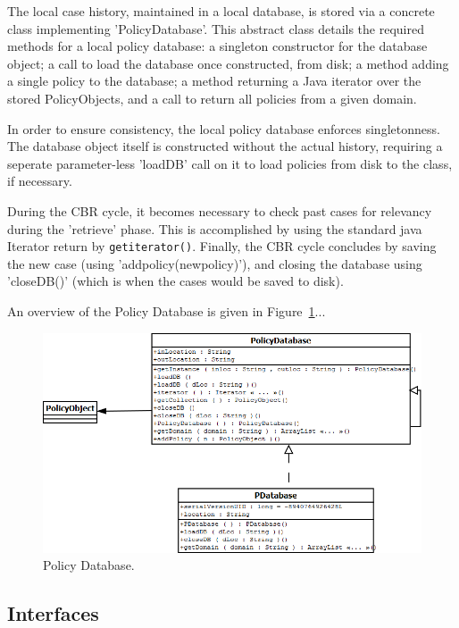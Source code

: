 The local case history, maintained in a local database, is stored via a concrete class implementing 'PolicyDatabase'. This abstract class details the required methods for a local policy database: a singleton constructor for the database object; a call to load the database once constructed, from disk; a method adding a single policy to the database; a method returning a Java iterator over the stored PolicyObjects, and a call to return all policies from a given domain.

In order to ensure consistency, the local policy database enforces singletonness. The database object itself is constructed without the actual history, requiring a seperate parameter-less 'loadDB' call on it to load policies from disk to the class, if necessary.

During the CBR cycle, it becomes necessary to check past cases for relevancy during the 'retrieve' phase. This is accomplished by using the standard java Iterator return by \texttt{getiterator()}.
Finally, the CBR cycle concludes by saving the new case (using 'addpolicy(newpolicy)'), and closing the database using 'closeDB()' (which is when the cases would be saved to disk).

An overview of the Policy Database is given in Figure~\ref{pd_fig}...



\begin{figure}[htbp]
\begin{center}
\includegraphics[width = \textwidth]{DesignReport/uml/pd.png}
\caption{Policy Database.}
\label{pd_fig}
\end{center}
\end{figure}

\subsection{Interfaces}


